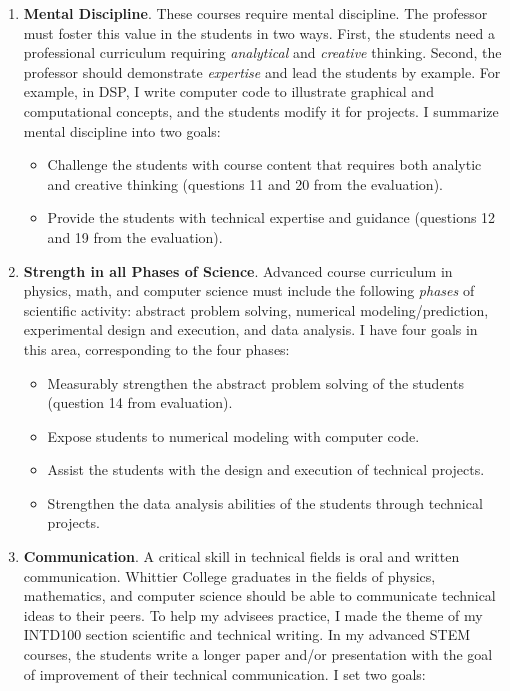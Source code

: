 \documentclass[../../../main.tex]{subfiles}
\begin{document}
\begin{enumerate}
\item \textbf{Mental Discipline}.  These courses require mental discipline.  The professor must foster this value in the students in two ways.  First, the students need a professional curriculum requiring \textit{analytical} and \textit{creative} thinking.  Second, the professor should demonstrate \textit{expertise} and lead the students by example.  For example, in DSP, I write computer code to illustrate graphical and computational concepts, and the students modify it for projects.  I summarize mental discipline into two goals:

\begin{itemize}
\item Challenge the students with course content that requires both analytic and creative thinking (questions 11 and 20 from the evaluation).
\item Provide the students with technical expertise and guidance (questions 12 and 19 from the evaluation).
\end{itemize}

\item \textbf{Strength in all Phases of Science}. Advanced course curriculum in physics, math, and computer science must include the following \textit{phases} of scientific activity: abstract problem solving, numerical modeling/prediction, experimental design and execution, and data analysis. I have four goals in this area, corresponding to the four phases:

\begin{itemize}
\item Measurably strengthen the abstract problem solving of the students (question 14 from evaluation).
\item Expose students to numerical modeling with computer code.
\item Assist the students with the design and execution of technical projects.
\item Strengthen the data analysis abilities of the students through technical projects.
\end{itemize}

\item \textbf{Communication}.  A critical skill in technical fields is oral and written communication.  Whittier College graduates in the fields of physics, mathematics, and computer science should be able to communicate technical ideas to their peers.  To help my advisees practice, I made the theme of my INTD100 section scientific and technical writing.  In my advanced STEM courses, the students write a longer paper and/or presentation with the goal of improvement of their technical communication.  I set two goals:


\end{enumerate}
\end{document}
